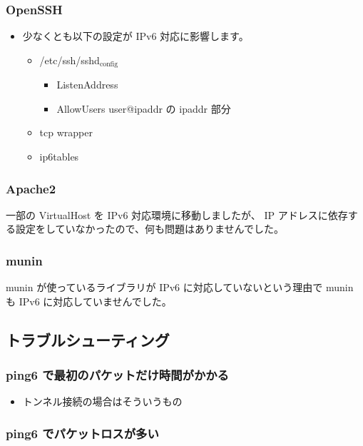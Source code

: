 \documentclass[mingoth,a4paper]{jsarticle}
\begin{document}
\subsubsection{OpenSSH}

\begin{itemize}
\item 少なくとも以下の設定が IPv6 対応に影響します。

\begin{itemize}
\item /etc/ssh/sshd$_{\mathrm{config}}$

\begin{itemize}
\item ListenAddress
\item AllowUsers user@ipaddr の ipaddr 部分
\end{itemize}

\item tcp wrapper
\item ip6tables
\end{itemize}

\end{itemize}
\subsubsection{Apache2}

一部の VirtualHost を IPv6 対応環境に移動しましたが、
IP アドレスに依存する設定をしていなかったので、何も問題はありませんでした。
\subsubsection{munin}

munin が使っているライブラリが IPv6 に対応していないという理由で
munin も IPv6 に対応していませんでした。
\subsection{トラブルシューティング}
\subsubsection{ping6 で最初のパケットだけ時間がかかる}

\begin{itemize}
\item トンネル接続の場合はそういうもの
\end{itemize}
\subsubsection{ping6 でパケットロスが多い}
\end{document}
